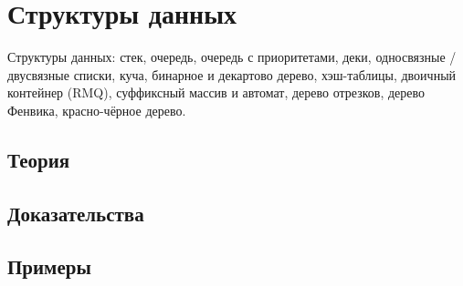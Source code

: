 
\section{Структуры данных}
\label{sec:2.3b.01-data-structures}

\begin{ticket}
Структуры данных: стек, очередь, очередь с приоритетами, деки, односвязные / двусвязные списки, куча, бинарное и декартово дерево, хэш-таблицы, двоичный контейнер (RMQ), суффиксный массив и автомат, дерево отрезков, дерево Фенвика, красно-чёрное дерево.
\end{ticket}

\subsection*{Теория}

\subsection*{Доказательства}

\subsection*{Примеры}
